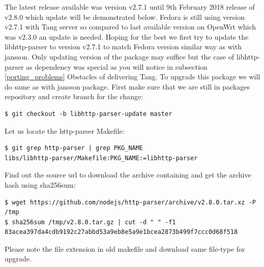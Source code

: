 The latest release available was version v2.7.1 until 9th February 2018 release of v2.8.0 which update will be demonstrated below.
Fedora is still using version v2.7.1 with Tang server so compared to last available version on OpenWrt which was v2.3.0 an update is needed.
Hoping for the best we first try to update the libhttp-parser to version v2.7.1 to match Fedora version similar way as with jansson.
Only updating version of the package may suffice but the case of libhttp-parser as dependency was special as you will notice in subsection \ref{porting_problems} Obstacles of delivering Tang.
To upgrade this package we will do same as with jansson package.
First make sure that we are still in packages repository and create branch for the change:
\begin{lstlisting}[columns=fixed,basicstyle=\ttfamily\footnotesize,tabsize=4,backgroundcolor=\color{yellow!10}]
$ git checkout -b libhttp-parser-update master
\end{lstlisting}
Let us locate the http-parser Makefile:
\begin{lstlisting}[columns=fixed,basicstyle=\ttfamily\footnotesize,tabsize=4,backgroundcolor=\color{yellow!10}]
$ git grep http-parser | grep PKG_NAME
libs/libhttp-parser/Makefile:PKG_NAME:=libhttp-parser
\end{lstlisting}
Find out the source url to download the archive containing and get the archive hash using sha256sum:
\begin{lstlisting}[columns=fixed,basicstyle=\ttfamily\footnotesize,tabsize=4,backgroundcolor=\color{yellow!10}]
$ wget https://github.com/nodejs/http-parser/archive/v2.8.0.tar.xz -P /tmp
$ sha256sum /tmp/v2.8.0.tar.gz | cut -d " " -f1
83acea397da4cdb9192c27abbd53a9eb8e5a9e1bcea2873b499f7ccc0d68f518
\end{lstlisting}
Please note the file extension in old makefile and download same file-type for upgrade.

